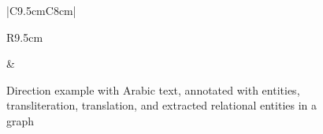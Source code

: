 \begin{figure}[tb]
\begin{center}
{\begin{tabular}{|C{9.5cm}C{8cm}|}
\begin{tabular}{R{9.5cm}}
  \end{tabular}
&
\resizebox{0.6\columnwidth}{!}{
  }
 \\ \hline
    \end{tabular}
}
\end{center}
  \vspace{-1.8em} 
  \caption{Direction example with Arabic text, annotated with entities, transliteration, translation, and extracted relational entities in a graph} 
  \label{fig:intromotiv}
  \vspace{-1.8em} 
\end{figure}
\transtrue
{}
